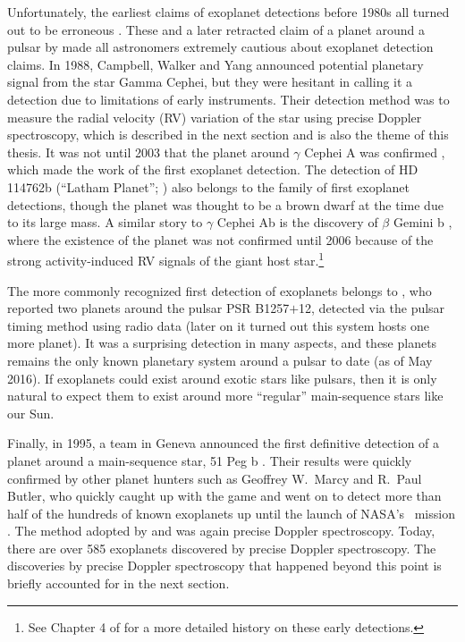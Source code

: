 Unfortunately, the earliest claims of exoplanet detections before
1980s all turned out to be erroneous \citep{1855MNRAS..15..228J,
1969AJ.....74..757V}. These and a later retracted claim of a planet
around a pulsar by \cite{1991Natur.352..311B} made all astronomers
extremely cautious about exoplanet detection claims. In 1988,
Campbell, Walker and Yang announced potential planetary signal from
the star Gamma Cephei, but they were hesitant in calling it a
detection due to limitations of early instruments. Their detection
method was to measure the radial velocity (RV) variation of the star
using precise Doppler spectroscopy, which is described in the next
section and is also the theme of this thesis.  It was not until 2003
that the planet around $\gamma$ Cephei A was confirmed
\citep{2003ApJ...599.1383H}, which made the work of
\cite{1988ApJ...331..902C} the first exoplanet detection. The
detection of HD 114762b (``Latham Planet'';
\citealt{1989Natur.339...38L}) also belongs to the family of first
exoplanet detections, though the planet was thought to be a brown
dwarf at the time due to its large mass. A similar story to $\gamma$
Cephei Ab is the discovery of $\beta$ Gemini b
\citep{1993ApJ...413..339H}, where the existence of the planet was not
confirmed until 2006 \citep{2006A&A...457..335H} because of the strong
activity-induced RV signals of the giant host star.\footnote{See
  Chapter 4 of \cite{2013pss3.book..489W} for a more detailed history
  on these early detections.} 

The more commonly recognized first detection of exoplanets belongs to
\cite{1992Natur.355..145W}, who reported two planets around the pulsar
PSR B1257$+$12, detected via the pulsar timing method using radio data
(later on it turned out this system hosts one more planet). It was a
surprising detection in many aspects, and these planets remains the
only known planetary system around a pulsar to date (as of May
2016). If exoplanets could exist around exotic stars like pulsars,
then it is only natural to expect them to exist around more
``regular'' main-sequence stars like our Sun.

Finally, in 1995, a team in Geneva announced the first definitive
detection of a planet around a main-sequence star, 51 Peg b
\citep{1995Natur.378..355M}. Their results were quickly confirmed by
other planet hunters such as Geoffrey W.\ Marcy and R.\ Paul Butler,
who quickly caught up with the game \citep{1996ApJ...464L.153B} and
went on to detect more than half of the hundreds of known exoplanets
up until the launch of NASA's \kepler\ mission
\cite{2010Sci...327..977B}. The method adopted by
\cite{1995Natur.378..355M} and \cite{1996ApJ...464L.153B} was again
precise Doppler spectroscopy. Today, there are over 585 exoplanets
discovered by precise Doppler spectroscopy. The discoveries by precise
Doppler spectroscopy that happened beyond this point is briefly
accounted for in the next section. 

